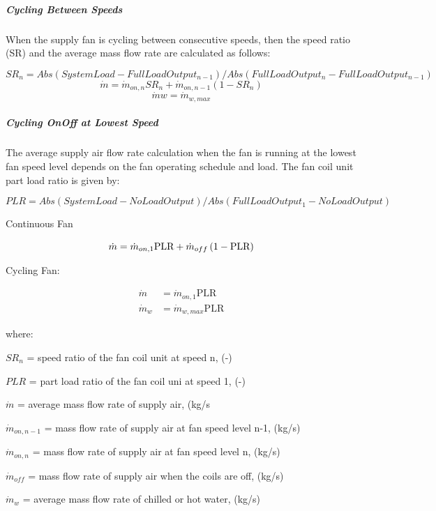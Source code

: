 \subparagraph{Cycling Between Speeds}\label{cycling-between-speeds}

When the supply fan is cycling between consecutive speeds, then the speed ratio (SR) and the average mass flow rate are calculated as follows:

\[{SR_{n}} = Abs({SystemLoad} - {FullLoadOutput_{n-1}}) / Abs({FullLoadOutput_{n}} - {FullLoadOutput_{n-1}})\] \[{\dot m} = {\dot m_{on, n}} {SR_{n}} + {\dot m_{on, n-1}} (1 - {SR_{n}})\] \[{\dot m{w}} = {\dot m_{w, max}}\]

\subparagraph{Cycling OnOff at Lowest Speed}\label{cycling-onoff-at-lowest-speed}

The average supply air flow rate calculation when the fan is running at the lowest fan speed level depends on the fan operating schedule and load. The fan coil unit part load ratio is given by:

\begin{equation}
{PLR} = Abs({SystemLoad} - {NoLoadOutput}) / Abs({FullLoadOutput_{1}} - {NoLoadOutput})
\end{equation}

Continuous Fan

\begin{equation}
  \dot{m} = \dot{m}_{on, 1} \text{PLR} + \dot{m}_{off} \PB{1 - \text{PLR}}
\end{equation}

Cycling Fan:

\begin{equation}
  \begin{array}{ll}
    \dot{m}   &= \dot{m}_{on, 1}\text{PLR} \\
    \dot{m}_w &= \dot{m}_{w, max} \text{PLR}
  \end{array}
\end{equation}

where:

$SR_n$ = speed ratio of the fan coil unit at speed n, (-)

$PLR$ = part load ratio of the fan coil uni at speed 1, (-)

$\dot{m}$ = average mass flow rate of supply air, (kg/s

$\dot{m}_{on, n-1}$ = mass flow rate of supply air at fan speed level n-1, (kg/s)

$\dot{m}_{on, n}$ = mass flow rate of supply air at fan speed level n, (kg/s)

$\dot{m}_{off}$ = mass flow rate of supply air when the coils are off, (kg/s)

$\dot{m}_{w}$ = average mass flow rate of chilled or hot water, (kg/s)

